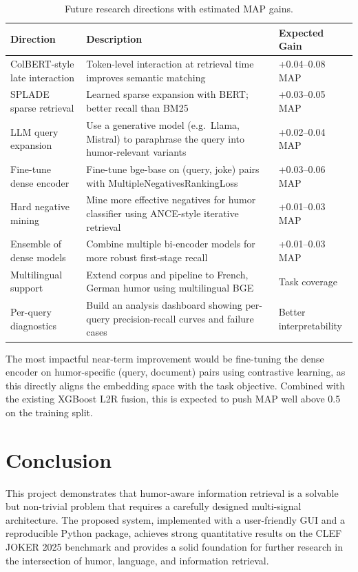 \begin{table}[H]
\centering
\begin{tabular}{|p{4cm}|p{6cm}|p{3.5cm}|}
\hline
\textbf{Direction} & \textbf{Description} & \textbf{Expected Gain} \\\hline
ColBERT-style late interaction & Token-level interaction at retrieval time improves semantic matching & +0.04--0.08 MAP \\\hline
SPLADE sparse retrieval & Learned sparse expansion with BERT; better recall than BM25 & +0.03--0.05 MAP \\\hline
LLM query expansion & Use a generative model (e.g.\ Llama, Mistral) to paraphrase the query into humor-relevant variants & +0.02--0.04 MAP \\\hline
Fine-tune dense encoder & Fine-tune bge-base on (query, joke) pairs with MultipleNegativesRankingLoss & +0.03--0.06 MAP \\\hline
Hard negative mining & Mine more effective negatives for humor classifier using ANCE-style iterative retrieval & +0.01--0.03 MAP \\\hline
Ensemble of dense models & Combine multiple bi-encoder models for more robust first-stage recall & +0.01--0.03 MAP \\\hline
Multilingual support & Extend corpus and pipeline to French, German humor using multilingual BGE & Task coverage \\\hline
Per-query diagnostics & Build an analysis dashboard showing per-query precision-recall curves and failure cases & Better interpretability \\\hline
\end{tabular}
\caption{Future research directions with estimated MAP gains.}
\label{tab:futurework}
\end{table}

The most impactful near-term improvement would be fine-tuning the dense encoder on humor-specific (query, document) pairs using contrastive learning, as this directly aligns the embedding space with the task objective. Combined with the existing XGBoost L2R fusion, this is expected to push MAP well above 0.5 on the training split.

\section{Conclusion}

This project demonstrates that humor-aware information retrieval is a solvable but non-trivial problem that requires a carefully designed multi-signal architecture. The proposed system, implemented with a user-friendly GUI and a reproducible Python package, achieves strong quantitative results on the CLEF JOKER 2025 benchmark and provides a solid foundation for further research in the intersection of humor, language, and information retrieval.
